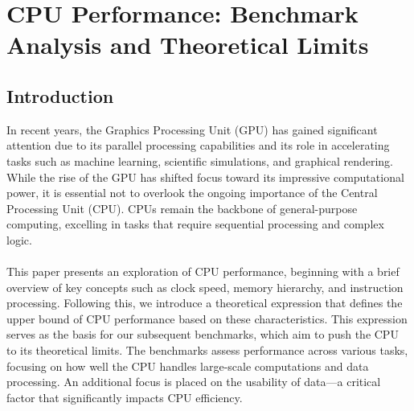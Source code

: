 \section{CPU Performance: Benchmark Analysis and Theoretical Limits}

\subsection{Introduction}
In recent years, the Graphics Processing Unit (GPU) has gained significant attention due to its parallel 
processing capabilities and its role in accelerating tasks such as machine learning, scientific 
simulations, and graphical rendering. While the rise of the GPU has shifted focus toward its impressive 
computational power, it is essential not to overlook the ongoing importance of the Central Processing 
Unit (CPU). CPUs remain the backbone of general-purpose computing, excelling in tasks that require 
sequential processing and complex logic.
\par

\paragraph*{}
This paper presents an exploration of CPU performance, beginning with a brief overview of key concepts such 
as clock speed, memory hierarchy, and instruction processing. Following this, we introduce a theoretical 
expression that defines the upper bound of CPU performance based on these characteristics. This expression 
serves as the basis for our subsequent benchmarks, which aim to push the CPU to its theoretical limits. 
The benchmarks assess performance across various tasks, focusing on how well the CPU handles large-scale 
computations and data processing. An additional focus is placed on the usability of data—a critical factor 
that significantly impacts CPU efficiency.
\par

\newpage